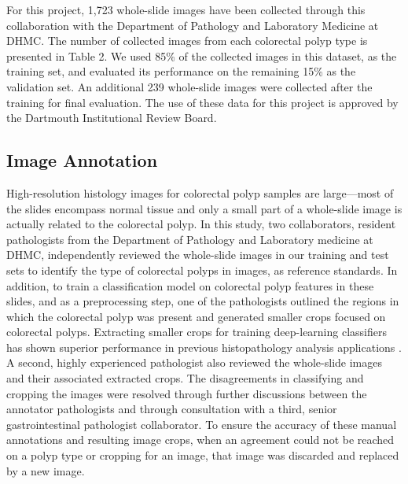 \documentclass[review]{elsarticle}
\begin{document}
For this project, 1,723 whole-slide images have been collected through this collaboration with the Department of Pathology and Laboratory Medicine at DHMC. The number of collected images from each colorectal polyp type is presented in Table 2. We used 85\% of the collected images in this dataset, as the training set, and evaluated its performance on the remaining 15\% as the validation set. An additional 239 whole-slide images were collected after the training for final evaluation. The use of these data for this project is approved by the Dartmouth Institutional Review Board. 

\subsection{Image Annotation}\label{annotation}
High-resolution histology images for colorectal polyp samples are large---most of the slides encompass normal tissue and only a small part of a whole-slide image is actually related to the colorectal polyp. In this study, two collaborators, resident pathologists from the Department of Pathology and Laboratory medicine at DHMC, independently reviewed the whole-slide images in our training and test sets to identify the type of colorectal polyps in images, as reference standards. In addition, to train a classification model on colorectal polyp features in these slides, and as a preprocessing step, one of the pathologists outlined the regions in which the colorectal polyp was present and generated smaller crops focused on colorectal polyps. Extracting smaller crops for training deep-learning classifiers has shown superior performance in previous histopathology analysis applications \citep{bengio2009learning}. A second, highly experienced pathologist also reviewed the whole-slide images and their associated extracted crops. The disagreements in classifying and cropping the images were resolved through further discussions between the annotator pathologists and through consultation with a third, senior gastrointestinal pathologist collaborator. To ensure the accuracy of these manual annotations and resulting image crops, when an agreement could not be reached on a polyp type or cropping for an image, that image was discarded and replaced by a new image.
\end{document}
